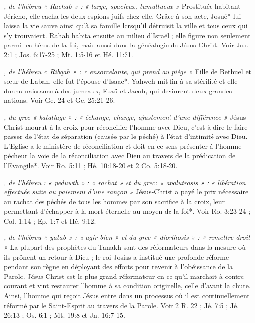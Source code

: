 \begin{multicols}{2}
\textit{, de l'hébreu « Rachab » : « large, spacieux, tumultueux »}\newline
Prostituée habitant Jéricho, elle cacha les deux espions juifs chez elle. Grâce à son acte, Josué* lui laissa la vie sauve ainsi qu'à sa famille lorsqu'il détruisit la ville et tous ceux qui s'y trouvaient. Rahab habita ensuite au milieu d'Israël ; elle figure non seulement parmi les héros de la foi, mais aussi dans la généalogie de Jésus-Christ. Voir Jos. 2:1 ; Jos. 6:17-25 ; Mt. 1:5-16 et Hé. 11:31.

\textit{, de l'hébreu « Ribqah » : « ensorcelante, qui prend au piège »}\newline
Fille de Bethuel et sœur de Laban, elle fut l'épouse d'Isaac*. Yahweh mit fin à sa stérilité et elle donna naissance à des jumeaux, Esaü et Jacob, qui devinrent deux grandes nations. Voir Ge. 24 et Ge. 25:21-26.

\textit{, du grec « katallage » : « échange, change, ajustement d'une différence »}\newline
Jésus-Christ mourut à la croix pour réconcilier l'homme avec Dieu, c'est-à-dire le faire passer de l'état de séparation (causée par le péché) à l'état d'intimité avec Dieu. L'Eglise a le ministère de réconciliation et doit en ce sens présenter à l'homme pécheur la voie de la réconciliation avec Dieu au travers de la prédication de l'Evangile*. Voir Ro. 5:11 ; Hé. 10:18-20 et 2 Co. 5:18-20.

\textit{, de l'hébreu : « peduwth » : « rachat » et du grec: « apolutrosis » : « libération effectuée suite au paiement d'une rançon »}\newline
Jésus-Christ a payé le prix nécessaire au rachat des péchés de tous les hommes par son sacrifice à la croix, leur permettant d'échapper à la mort éternelle au moyen de la foi*. Voir Ro. 3:23-24 ; Col. 1:14 ; Ep. 1:7 et Hé. 9:12.

\textit{, de l'hébreu « yatab » : « agir bien » et du grec « diorthosis » : « remettre droit »}\newline
La plupart des prophètes du Tanakh sont des réformateurs dans la mesure où ils prônent un retour à Dieu ; le roi Josias a institué une profonde réforme pendant son règne en déployant des efforts pour revenir à l'obéissance de la Parole. Jésus-Christ est le plus grand réformateur en ce qu'il marchait à contre-courant et vint restaurer l'homme à sa condition originelle, celle d'avant la chute. Ainsi, l'homme qui reçoit Jésus entre dans un processus où il est continuellement réformé par le Saint-Esprit au travers de la Parole. Voir 2 R. 22 ; Jé. 7:5 ; Jé. 26:13 ; Os. 6:1 ; Mt. 19:8 et Jn. 16:7-15.


\end{multicols}
